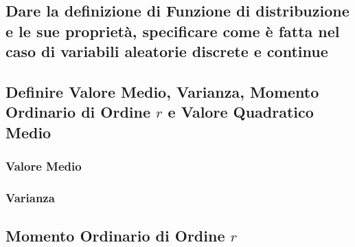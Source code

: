 \documentclass[12pt,oneside,openany]{memoir}
\numberwithin{equation}{subsection}
\begin{document}

\subsection{Dare la definizione di Funzione di distribuzione e le sue
propriet\`a, specificare come \`e fatta nel caso di variabili aleatorie discrete
e continue}


\subsection{Definire Valore Medio, Varianza, Momento Ordinario di Ordine $r$ e
Valore Quadratico Medio}


\subsubsection{Valore Medio}


\subsubsection{Varianza}


\subsection{Momento Ordinario di Ordine $r$}
\end{document}
